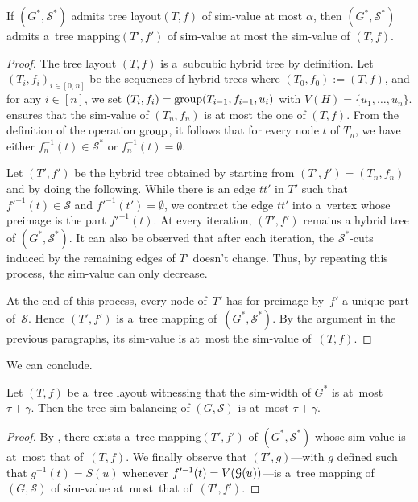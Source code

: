 \documentclass[a4paper,UKenglish,cleveref,hyperref,autoref]{lipics-v2021}
\newcommand{\tmap}{tree mapping\xspace}
\newcommand{\htree}{hybrid tree\xspace}
\begin{document}
\begin{lemma}\label{lem:htree-to-tmap}
  If  $(G^*, \mathcal S^*)$ admits tree layout$(T,f)$ of sim-value at most $\alpha$, then $(G^*, \mathcal S^*)$ admits a~\tmap $(T',f')$ of sim-value at most the sim-value of $(T,f)$.
\end{lemma}
\begin{proof}
	The tree layout $(T, f)$ is a~subcubic \htree by definition.
	Let $(T_i, f_i)_{i \in [0,n]}$ be the sequences of hybrid trees where $(T_0,f_0):=(T,f)$, and for any $i \in [n]$, we set $(T_i, f_i) = \text{group}(T_{i-1}, f_{i-1}, u_i)$ with $V(H) = \{u_1, \dots, u_n\}$.
	 ensures that the sim-value of $(T_n,f_n)$ is at most the one of $(T, f)$.
	From the definition of the operation $\text{group}$, it follows that for every node $t$ of $T_n$, we have either $f_n^{-1}(t) \in \mathcal S^*$ or $f_n^{-1}(t) = \emptyset$.
	
	Let $(T',f')$ be the \htree obtained by starting from $(T',f')= (T_n,f_n)$ and by doing the following.
	While there is an edge $tt'$ in $T'$ such that $f'^{-1}(t) \in \mathcal S$ and $f'^{-1}(t') = \emptyset$, we contract the edge $tt'$ into a~vertex whose preimage is the part $f'^{-1}(t)$.
	At every iteration, $(T',f')$ remains a \htree of $(G^*, \mathcal S^*)$.
	It can also be observed that after each iteration, the $\mathcal S^*$-cuts induced by the remaining edges of $T'$ doesn't change.
	Thus, by repeating this process, the sim-value can only decrease.
	
	At the end of this process, every node of~$T'$ has for preimage by~$f'$ a unique part of~$\mathcal S$.
	Hence $(T',f')$ is a~\tmap of~$(G^*,\mathcal S^*)$.
	By the argument in the previous paragraphs, its sim-value is at~most the sim-value of~$(T,f)$.
\end{proof}

We can conclude.

\begin{lemma}
  Let $(T, f)$ be a~tree layout witnessing that the sim-width of $G^*$ is at~most~$\tau+\gamma$.
  Then the tree sim-balancing of $(G,\mathcal S)$ is at~most $\tau+\gamma$.
\end{lemma}
\begin{proof}
  By , there exists a~\tmap $(T',f')$ of $(G^*, \mathcal S^*)$ whose sim-value is at~most that of~$(T, f)$.
  We finally observe that $(T',g)$---with $g$ defined such that $g^{-1}(t) = S(u)$ whenever $f'^{-1}(t) = V(\mathcal G(u))$---is a~\tmap of $(G,\mathcal S)$ of sim-value at~most~that of~$(T',f')$. 
\end{proof}
\end{document}
